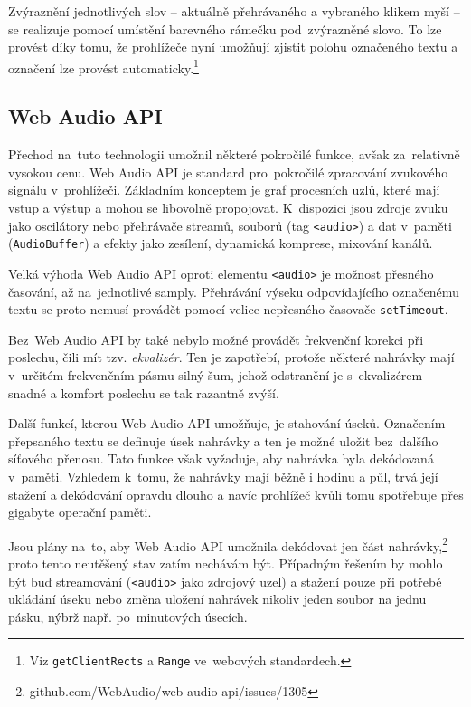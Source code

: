 Zvýraznění jednotlivých slov -- aktuálně přehrávaného a vybraného klikem myší --
se realizuje pomocí umístění barevného rámečku pod~zvýrazněné slovo. To lze
provést díky tomu, že prohlížeče nyní umožňují zjistit polohu označeného textu a
označení lze provést automaticky.\footnote{Viz \texttt{getClientRects} a
\texttt{Range} ve~webových standardech.}

\subsection{Web Audio API}

Přechod na~tuto technologii umožnil některé pokročilé funkce, avšak za~relativně
vysokou cenu. Web Audio API je standard pro~pokročilé zpracování zvukového
signálu v~prohlížeči. Základním konceptem je graf procesních uzlů, které mají
vstup a výstup a mohou se libovolně propojovat. K~dispozici jsou zdroje zvuku
jako oscilátory nebo přehrávače streamů, souborů (tag \texttt{<audio>}) a dat
v~paměti (\texttt{AudioBuffer}) a efekty jako zesílení, dynamická komprese,
mixování kanálů.

Velká výhoda Web Audio API oproti elementu \texttt{<audio>} je možnost přesného
časování, až na~jednotlivé samply. Přehrávání výseku odpovídajícího označenému
textu se proto nemusí provádět pomocí velice nepřesného časovače
\texttt{setTimeout}.

Bez~Web Audio API by také nebylo možné provádět frekvenční korekci při poslechu,
čili mít tzv. \textit{ekvalizér}. Ten je zapotřebí, protože některé nahrávky
mají v~určitém frekvenčním pásmu silný šum, jehož odstranění je s~ekvalizérem
snadné a komfort poslechu se tak razantně zvýší.

Další funkcí, kterou Web Audio API umožňuje, je stahování úseků. Označením
přepsaného textu se definuje úsek nahrávky a ten je možné uložit bez~dalšího
síťového přenosu. Tato funkce však vyžaduje, aby nahrávka byla dekódovaná
v~paměti. Vzhledem k~tomu, že nahrávky mají běžně i hodinu a půl, trvá její
stažení a dekódování opravdu dlouho a navíc prohlížeč kvůli tomu spotřebuje přes
gigabyte operační paměti.

Jsou plány na~to, aby Web Audio API umožnila dekódovat jen část
nahrávky,\footnote{github.com/WebAudio/web-audio-api/issues/1305} proto tento
neutěšený stav zatím nechávám být. Případným řešením by mohlo být buď
streamování (\texttt{<audio>} jako zdrojový uzel) a stažení pouze při potřebě
ukládání úseku nebo změna uložení nahrávek nikoliv jeden soubor na jednu pásku,
nýbrž např. po~minutových úsecích.


